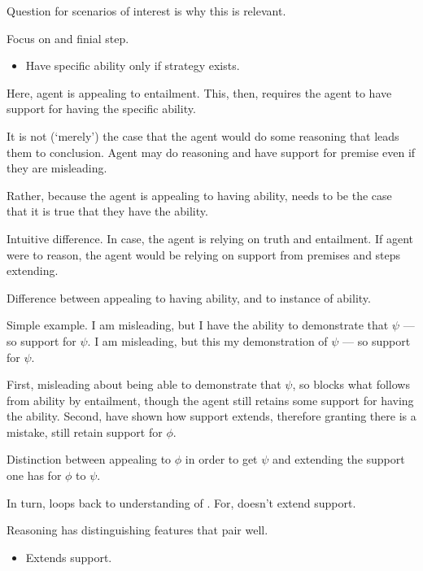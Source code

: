 \begin{note}
  Question for scenarios of interest is why this is relevant.

  Focus on \AR{} and finial step.
  \begin{itemize}
  \item Have specific ability only if strategy exists.
  \end{itemize}
  Here, agent is appealing to entailment.
  This, then, requires the agent to have support for having the specific ability.

  It is not (`merely') the case that the agent would do some reasoning that leads them to conclusion.
  Agent may do reasoning and have support for premise even if they are misleading.

  Rather, because the agent is appealing to having ability, needs to be the case that it is true that they have the ability.

  
  Intuitive difference.
  In \AR{} case, the agent is relying on truth and entailment.
  If agent were to reason, the agent would be relying on support from premises and steps extending.

  Difference between appealing to having ability, and to instance of ability.

  Simple example.
  I am misleading, but I have the ability to demonstrate that \(\psi\) --- so support for \(\psi\).
  I am misleading, but this my demonstration of \(\psi\) --- so support for \(\psi\).

  First, misleading about being able to demonstrate that \(\psi\), so blocks what follows from ability by entailment, though the agent still retains some support for having the ability.
  Second, have shown how support extends, therefore granting there is a mistake, still retain support for \(\phi\).

  Distinction between appealing to \(\phi\) in order to get \(\psi\) and extending the support one has for \(\phi\) to \(\psi\).

  In turn, loops back to understanding of \nI{}.
  For, \nI{} doesn't extend support.
\end{note}

\begin{note}
  Reasoning has distinguishing features that pair well.
  \begin{itemize}
  \item Extends support.
  \end{itemize}
\end{note}

